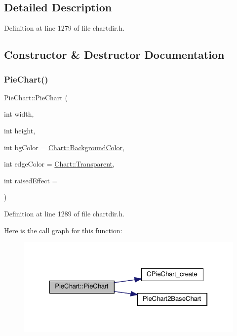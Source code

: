 \subsection{Detailed Description}


Definition at line 1279 of file chartdir.\+h.



\subsection{Constructor \& Destructor Documentation}
\mbox{\label{class_pie_chart_a3d19f7488d8cb9ffea3a112ad689d15c}} 
\subsubsection{\texorpdfstring{Pie\+Chart()}{PieChart()}}
{\footnotesize\ttfamily Pie\+Chart\+::\+Pie\+Chart (\begin{DoxyParamCaption}\item[{int}]{width,  }\item[{int}]{height,  }\item[{int}]{bg\+Color = {\ttfamily \hyperlink{namespace_chart_abee0d882fdc9ad0b001245ad9fc64011a134193bde693b9d152d0c6dc59fa7d7f}{Chart\+::\+Background\+Color}},  }\item[{int}]{edge\+Color = {\ttfamily \hyperlink{namespace_chart_abee0d882fdc9ad0b001245ad9fc64011afc6811800a9e2582dac0157b6279f836}{Chart\+::\+Transparent}},  }\item[{int}]{raised\+Effect = {} }\end{DoxyParamCaption})\hspace{0.3cm}{\ttfamily [inline]}}



Definition at line 1289 of file chartdir.\+h.

Here is the call graph for this function\+:
\nopagebreak
\begin{figure}[H]
\begin{center}
\leavevmode
\includegraphics[width=322pt]{class_pie_chart_a3d19f7488d8cb9ffea3a112ad689d15c_cgraph}
\end{center}
\end{figure}


